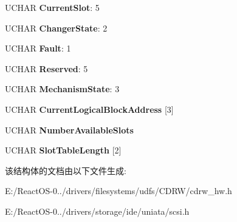\begin{DoxyCompactItemize}
\item 
\mbox{\label{struct___m_e_c_h_a_n_i_c_a_l___s_t_a_t_u_s___i_n_f_o_r_m_a_t_i_o_n___h_e_a_d_e_r_ac67ffb6f65061a8df1cdba98fb415ebe}} 
U\+C\+H\+AR {\bfseries Current\+Slot}\+: 5
\item 
\mbox{\label{struct___m_e_c_h_a_n_i_c_a_l___s_t_a_t_u_s___i_n_f_o_r_m_a_t_i_o_n___h_e_a_d_e_r_a13b7058ae2ca50404d487dc1962415c3}} 
U\+C\+H\+AR {\bfseries Changer\+State}\+: 2
\item 
\mbox{\label{struct___m_e_c_h_a_n_i_c_a_l___s_t_a_t_u_s___i_n_f_o_r_m_a_t_i_o_n___h_e_a_d_e_r_a45edff54cb8ca6d8f076fadebe36342f}} 
U\+C\+H\+AR {\bfseries Fault}\+: 1
\item 
\mbox{\label{struct___m_e_c_h_a_n_i_c_a_l___s_t_a_t_u_s___i_n_f_o_r_m_a_t_i_o_n___h_e_a_d_e_r_ae5fc7356ed935c15c43e5caf7896e92e}} 
U\+C\+H\+AR {\bfseries Reserved}\+: 5
\item 
\mbox{\label{struct___m_e_c_h_a_n_i_c_a_l___s_t_a_t_u_s___i_n_f_o_r_m_a_t_i_o_n___h_e_a_d_e_r_a47dc5818a18fa8eee109a5b18e4feaf8}} 
U\+C\+H\+AR {\bfseries Mechanism\+State}\+: 3
\item 
\mbox{\label{struct___m_e_c_h_a_n_i_c_a_l___s_t_a_t_u_s___i_n_f_o_r_m_a_t_i_o_n___h_e_a_d_e_r_a1f74701b747809a263a22a59aa7e78c9}} 
U\+C\+H\+AR {\bfseries Current\+Logical\+Block\+Address} \mbox{[}3\mbox{]}
\item 
\mbox{\label{struct___m_e_c_h_a_n_i_c_a_l___s_t_a_t_u_s___i_n_f_o_r_m_a_t_i_o_n___h_e_a_d_e_r_a78a4ae3c627baed98868eee20027da66}} 
U\+C\+H\+AR {\bfseries Number\+Available\+Slots}
\item 
\mbox{\label{struct___m_e_c_h_a_n_i_c_a_l___s_t_a_t_u_s___i_n_f_o_r_m_a_t_i_o_n___h_e_a_d_e_r_a2721552f787915ec19dee9bb49dc3197}} 
U\+C\+H\+AR {\bfseries Slot\+Table\+Length} \mbox{[}2\mbox{]}
\end{DoxyCompactItemize}


该结构体的文档由以下文件生成\+:\begin{DoxyCompactItemize}
\item 
E\+:/\+React\+O\+S-\/0../drivers/filesystems/udfs/\+C\+D\+R\+W/cdrw\+\_\+hw.\+h\item 
E\+:/\+React\+O\+S-\/0../drivers/storage/ide/uniata/scsi.\+h\end{DoxyCompactItemize}
